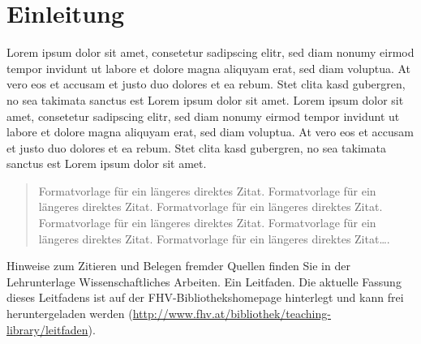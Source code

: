 \chapter{Einleitung}
Lorem ipsum dolor sit amet, consetetur sadipscing elitr, sed diam nonumy
eirmod tempor invidunt ut labore et dolore magna aliquyam erat, sed diam
voluptua. At vero eos et accusam et justo duo dolores et ea rebum. Stet
clita kasd gubergren, no sea takimata sanctus est Lorem ipsum dolor sit
amet. Lorem ipsum dolor sit amet, consetetur sadipscing elitr, sed diam
nonumy eirmod tempor invidunt ut labore et dolore magna aliquyam erat, sed
diam voluptua. At vero eos et accusam et justo duo dolores et ea rebum.
Stet clita kasd gubergren, no sea takimata sanctus est Lorem ipsum dolor
sit amet.

\begin{quote}

  Formatvorlage für ein längeres direktes Zitat. Formatvorlage für ein
  längeres direktes Zitat. Formatvorlage für ein längeres direktes Zitat.
  Formatvorlage für ein längeres direktes Zitat. Formatvorlage für ein
  längeres direktes Zitat. Formatvorlage für ein längeres direktes Zitat….

\end{quote}

Hinweise zum Zitieren und Belegen fremder Quellen finden Sie in der
Lehrunterlage \glqq Wissenschaftliches Arbeiten. Ein Leitfaden\grqq. Die
aktuelle Fassung dieses Leitfadens ist auf der FHV-Bibliothekshomepage
hinterlegt und kann frei heruntergeladen werden (\href{http://www.fhv.at/bibliothek/teaching-library/leitfaden}{http://www.fhv.at/bibliothek/teaching-library/leitfaden}).
